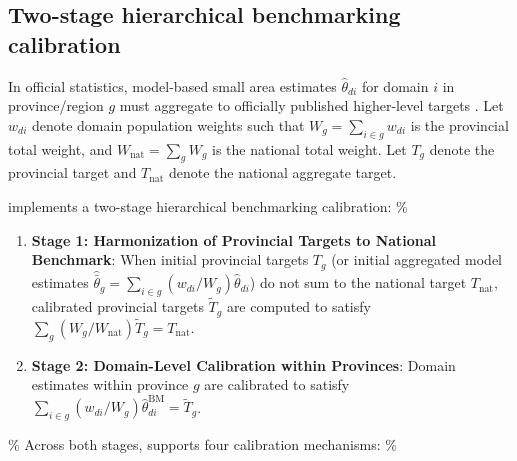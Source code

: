 \subsection{Two-stage hierarchical benchmarking calibration} \label{sec:methods_bench}

In official statistics, model-based small area estimates \(\hat{\theta}_{di}\) for domain \(i\) in province/region \(g\) must aggregate to officially published higher-level targets \citep{rao2015small, stefan2020benchmarking}. Let \(w_{di}\) denote domain population weights such that \(W_g = \sum_{i \in g} w_{di}\) is the provincial total weight, and \(W_{\text{nat}} = \sum_g W_g\) is the national total weight. Let \(T_g\) denote the provincial target and \(T_{\text{nat}}\) denote the national aggregate target.

 implements a two-stage hierarchical benchmarking calibration:
\%

\begin{enumerate}
  \item \textbf{Stage 1: Harmonization of Provincial Targets to National Benchmark}: When initial provincial targets $T_g$ (or initial aggregated model estimates $\hat{\bar{\theta}}_g = \sum_{i \in g} (w_{di}/W_g)\hat{\theta}_{di}$) do not sum to the national target $T_{\text{nat}}$, calibrated provincial targets $\tilde{T}_g$ are computed to satisfy $\sum_g (W_g / W_{\text{nat}}) \tilde{T}_g = T_{\text{nat}}$.
  \item \textbf{Stage 2: Domain-Level Calibration within Provinces}: Domain estimates within province $g$ are calibrated to satisfy $\sum_{i \in g} (w_{di}/W_g) \hat{\theta}_{di}^{\text{BM}} = \tilde{T}_g$.
\end{enumerate}

\%
Across both stages,  supports four calibration mechanisms:
\%

